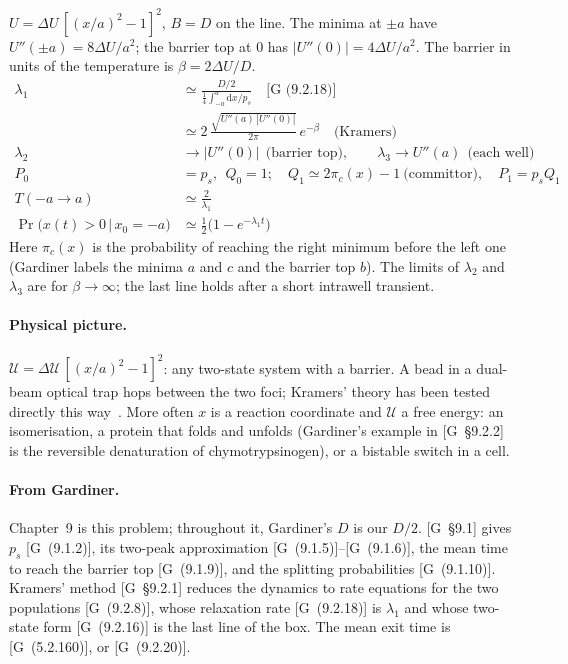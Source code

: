\documentclass[11pt]{article}
\numberwithin{equation}{section}
\newcommand{\dd}{\mathrm{d}}
\newcommand{\given}{\,|\,}
\newcommand{\G}[1]{[G~(#1)]}
\newcommand{\Gs}[1]{[G~\S#1]}
\begin{document}
\begin{keyresults}
$U=\Delta U\,[(x/a)^2-1]^2$, $B=D$ on the line. The minima at $\pm a$ have $U''(\pm a)=8\Delta U/a^2$; the barrier
top at $0$ has $|U''(0)|=4\Delta U/a^2$. The barrier in units of the temperature is $\beta=2\Delta U/D$.
\begin{align}
  \lambda_1 &\simeq \frac{D/2}{\frac14\int_{-a}^{a}\dd x/p_s}\quad\text{\G{9.2.18}} \\
  &\simeq 2\,\frac{\sqrt{U''(a)\,|U''(0)|}}{2\pi}\,e^{-\beta}\quad\text{(Kramers)} \\
  \lambda_2 &\to |U''(0)|\ \ \text{(barrier top)},\qquad \lambda_3\to U''(a)\ \ \text{(each well)} \\
  P_0 &= p_s,\ \ Q_0=1;\quad Q_1\simeq 2\pi_c(x)-1\ \text{(committor)},\quad P_1=p_sQ_1 \\
  T(-a\to a) &\simeq\frac2{\lambda_1} \\
  \Pr\bigl(x(t)>0\given x_0=-a\bigr) &\simeq \tfrac12\bigl(1-e^{-\lambda_1t}\bigr)
\end{align}
Here $\pi_c(x)$ is the probability of reaching the right minimum before the left one (Gardiner labels the
minima $a$ and $c$ and the barrier top $b$). The limits of $\lambda_2$ and $\lambda_3$ are for $\beta\to\infty$;
the last line holds after a short intrawell transient.
\end{keyresults}

\paragraph{Physical picture.} $\mathcal U=\Delta\mathcal U\,[(x/a)^2-1]^2$: any two-state system with a barrier.
A bead in a dual-beam optical trap hops between the two foci; Kramers' theory has been tested directly this
way~\cite{mccann}. More often $x$ is a reaction coordinate and $\mathcal U$ a free energy: an isomerisation, a
protein that folds and unfolds (Gardiner's example in \Gs{9.2.2} is the reversible denaturation of
chymotrypsinogen), or a bistable switch in a cell.

\paragraph{From Gardiner.} Chapter~9 is this problem; throughout it, Gardiner's $D$ is our $D/2$. \Gs{9.1} gives
$p_s$ \G{9.1.2}, its two-peak approximation \G{9.1.5}--\G{9.1.6}, the mean time to reach the barrier top
\G{9.1.9}, and the splitting probabilities \G{9.1.10}. Kramers' method \Gs{9.2.1} reduces the dynamics to rate
equations for the two populations \G{9.2.8}, whose relaxation rate \G{9.2.18} is $\lambda_1$ and whose two-state
form \G{9.2.16} is the last line of the box. The mean exit time is \G{5.2.160}, or \G{9.2.20}.
\end{document}
